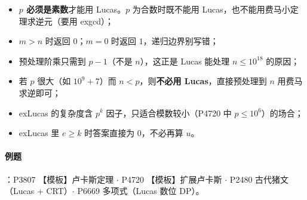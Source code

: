 \begin{itemize}
    \item \textbf{$p$ 必须是素数}才能用 Lucas。$p$ 为合数时既不能用 Lucas，也不能用费马小定理求逆元（要用 exgcd）；
    \item $m > n$ 时返回 $0$；$m = 0$ 时返回 $1$，递归边界别写错；
    \item 预处理阶乘只需到 $p-1$（不是 $n$），这正是 Lucas 能处理 $n \le 10^{18}$ 的原因；
    \item 若 $p$ 很大（如 $10^9+7$）而 $n < p$，则\textbf{不必用 Lucas}，直接预处理到 $n$ 用费马求逆即可；
    \item exLucas 的复杂度含 $p^k$ 因子，只适合模数较小（P4720 中 $p \le 10^6$）的场合；
    \item exLucas 里 $e \ge k$ 时答案直接为 $0$，不必再算 $u$。
\end{itemize}

\paragraph{例题}：P3807 【模板】卢卡斯定理 $\cdot$ P4720 【模板】扩展卢卡斯 $\cdot$
P2480 古代猪文（Lucas + CRT）$\cdot$ P6669 多项式（Lucas 数位 DP）。
